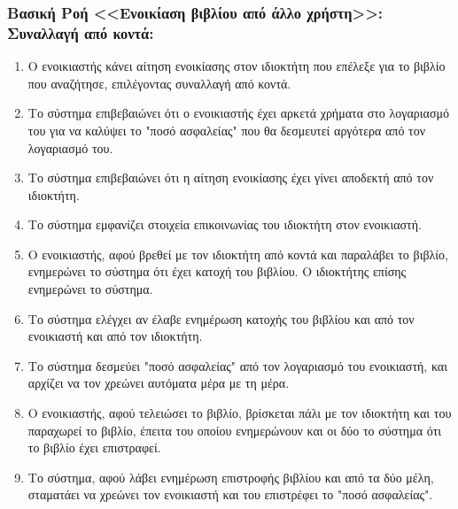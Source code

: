 \documentclass[12pt,a4paper]{article}
\begin{document}
\subsubsection*{Βασική Ροή <<Ενοικίαση βιβλίου από άλλο χρήστη>>: Συναλλαγή από κοντά:}
\begin{enumerate}
    \item Ο ενοικιαστής κάνει αίτηση ενοικίασης στον ιδιοκτήτη που επέλεξε για το βιβλίο που αναζήτησε, επιλέγοντας συναλλαγή από κοντά.
        \label{Επιλογή τρόπου συναλλαγής}
    \item Το σύστημα επιβεβαιώνει ότι ο ενοικιαστής έχει αρκετά χρήματα στο λογαριασμό του για να καλύψει το "ποσό ασφαλείας" που θα δεσμευτεί αργότερα από τον λογαριασμό του.
        \label{Έλεγχος ποσού ασφαλείας}
    \item Το σύστημα επιβεβαιώνει ότι η αίτηση ενοικίασης έχει γίνει αποδεκτή από τον ιδιοκτήτη.
        \label{Αποδοχή ή απόρριψη συναλλαγής}
    \item Το σύστημα εμφανίζει στοιχεία επικοινωνίας του ιδιοκτήτη στον ενοικιαστή.
    \item Ο ενοικιαστής, αφού βρεθεί με τον ιδιοκτήτη από κοντά και παραλάβει το βιβλίο, ενημερώνει το σύστημα ότι έχει κατοχή του βιβλίου. Ο ιδιοκτήτης επίσης ενημερώνει το σύστημα.
    \item Το σύστημα ελέγχει αν έλαβε ενημέρωση κατοχής του βιβλίου και από τον ενοικιαστή και από τον ιδιοκτήτη.
        \label {Δεν ενημερώνεται η κατοχή}
    \item Το σύστημα δεσμεύει "ποσό ασφαλείας" από τον λογαριασμό του ενοικιαστή, και αρχίζει να τον χρεώνει αυτόματα μέρα με τη μέρα.
        \label{Τέλος dispute resolved - Τέλος χρημάτων}
    \item Ο ενοικιαστής, αφού τελειώσει το βιβλίο, βρίσκεται πάλι με τον ιδιοκτήτη και του παραχωρεί το βιβλίο, έπειτα του οποίου ενημερώνουν και οι δύο το σύστημα ότι το βιβλίο έχει επιστραφεί.
        \label{Επιστροφή βιβλίου - Τέλος λεφτά δεν φτάνουν}
    \item Το σύστημα, αφού λάβει ενημέρωση επιστροφής βιβλίου και από τα δύο μέλη, σταματάει να χρεώνει τον ενοικιαστή και του επιστρέφει το "ποσό ασφαλείας".
        \label{Τέλος ενοικίασης}
\end{enumerate}
\end{document}
